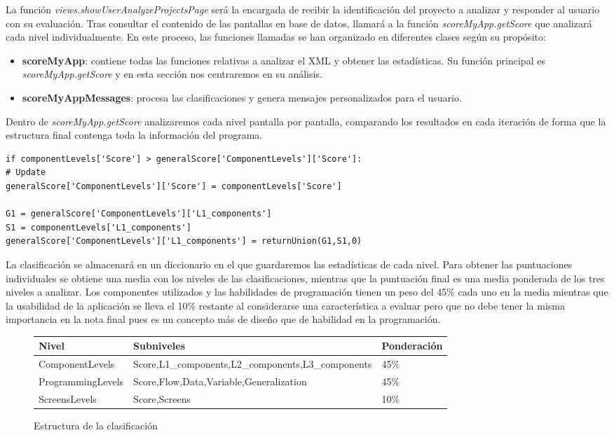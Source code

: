 \documentclass[a4paper, 12pt]{book}
\begin{document}
La función \textit{views.showUserAnalyzeProjectsPage} será la encargada de recibir la identificación del proyecto a analizar y responder al usuario con su evaluación. Tras consultar el contenido de las pantallas en base de datos, llamará a la función \textit{scoreMyApp.getScore} que analizará cada nivel individualmente. En este proceso, las funciones llamadas se han organizado en diferentes clases según su propósito:
\begin{itemize}
  \item \textbf{scoreMyApp}: contiene todas las funciones relativas a analizar el XML y obtener las estadísticas. Su función principal es \textit{scoreMyApp.getScore} y en esta sección nos centraremos en su análisis. 
  \item \textbf{scoreMyAppMessages}: procesa las clasificaciones y genera mensajes personalizados para el usuario.
\end{itemize}

Dentro de \textit{scoreMyApp.getScore} analizaremos cada nivel pantalla por pantalla, comparando los resultados en cada iteración de forma que la estructura final contenga toda la información del programa. 
\begin{lstlisting}
if componentLevels['Score'] > generalScore['ComponentLevels']['Score']:
# Update
generalScore['ComponentLevels']['Score'] = componentLevels['Score']

G1 = generalScore['ComponentLevels']['L1_components']
S1 = componentLevels['L1_components']
generalScore['ComponentLevels']['L1_components'] = returnUnion(G1,S1,0)
\end{lstlisting}
La clasificación se almacenará en un diccionario en el que guardaremos las estadísticas de cada nivel. Para obtener las puntuaciones individuales se obtiene una media con los niveles de las clasificaciones, mientras que la puntuación final es una media ponderada de los tres niveles a analizar. Los componentes utilizados y las habilidades de programación tienen un peso del 45\% cada uno en la media mientras que la usabilidad de la aplicación se lleva el 10\% restante al considerarse una característica a evaluar pero que no debe tener la misma importancia en la nota final pues es un concepto más de diseño que de habilidad en la programación.  
\begin{figure}[H]
	\begin{center}
	    \begin{tabular}{| l | l | l | }
	    \hline
	    \textbf{Nivel} & \textbf{Subniveles} & \textbf{Ponderación} \\ \hline
	    ComponentLevels & Score,L1\_components,L2\_components,L3\_components & 45\% \\ \hline
	    ProgrammingLevels & Score,Flow,Data,Variable,Generalization & 45\% \\ \hline
	    ScreensLevels & Score,Screens & 10\% \\ \hline
            \end{tabular}
	\end{center}
	\caption{Estructura de la clasificación}
	\label{fig:scoreStructure}
\end{figure}
\end{document}
